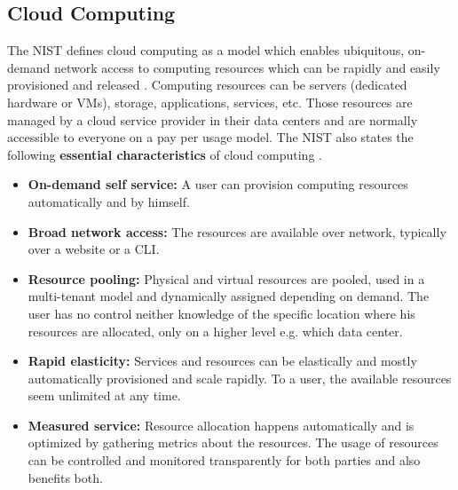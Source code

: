 \subsection{Cloud Computing}
The \gls{NIST} defines cloud computing as a model which enables ubiquitous, on-demand network access to computing resources which can be rapidly and easily provisioned and released \cite{Mell:2011:SND:2206223}. Computing resources can be servers (dedicated hardware or \gls{VM}s), storage, applications, services, etc. Those resources are managed by a cloud service provider in their data centers and are normally accessible to everyone on a pay per usage model. The \gls{NIST} also states the following \textbf{essential characteristics} of cloud computing \cite{Mell:2011:SND:2206223}.
\begin{itemize}
    \item \textbf{On-demand self service:} A user can provision computing resources automatically and by himself.
    \item \textbf{Broad network access:} The resources are available over network, typically over a website or a \gls{CLI}.
    \item \textbf{Resource pooling:} Physical and virtual resources are pooled, used in a multi-tenant model and dynamically assigned depending on demand. The user has no control neither knowledge of the specific location where his resources are allocated, only on a higher level e.g. which data center.
    \item \textbf{Rapid elasticity:} Services and resources can be elastically and mostly automatically provisioned and scale rapidly. To a user, the available resources seem unlimited at any time.
    \item \textbf{Measured service:} Resource allocation happens automatically and is optimized by gathering metrics about the resources. The usage of resources can be controlled and monitored transparently for both parties and also benefits both.
\end{itemize}


